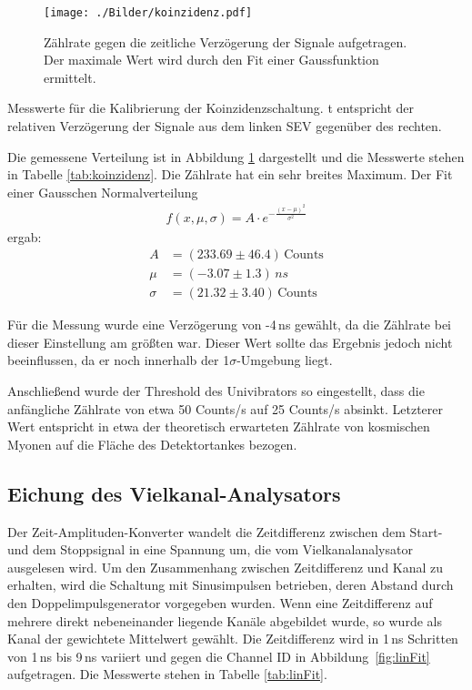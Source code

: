 \begin{figure}[htbp]
	\texttt{[image: ./Bilder/koinzidenz.pdf]}
	\caption{Zählrate gegen die zeitliche Verzögerung der Signale aufgetragen. Der maximale Wert wird durch den Fit einer Gaussfunktion ermittelt.}
	\label{fig:koinzidenz}
\end{figure}

\begin{table}[htbp]
	
	\caption{Messwerte für die Kalibrierung der Koinzidenzschaltung. t entspricht der relativen Verzögerung der Signale aus dem linken SEV gegenüber des rechten.}
	\label{tab:koinzidenz}
\end{table}

Die gemessene Verteilung ist in Abbildung \ref{fig:koinzidenz} dargestellt und die Messwerte stehen in Tabelle \ref{tab:koinzidenz}. Die Zählrate hat ein sehr breites Maximum. Der Fit einer Gausschen Normalverteilung
\begin{align}
	f(x,\mu,\sigma) = A\cdot e^{-\frac{(x-\mu)^2}{\sigma^2}}
\end{align}
ergab:
\begin{align}
A &= (233.69 \pm 46.4)\,\text{Counts}\\
\mu &= (-3.07 \pm 1.3)\,\si{ns}\\
\sigma &= ({21.32} \pm 3.40)\,\si{\text{Counts}}
\end{align}

Für die Messung wurde eine Verzögerung von -4\,\si{ns} gewählt, da die Zählrate bei dieser Einstellung am größten war. Dieser Wert sollte das Ergebnis jedoch nicht beeinflussen, da er noch innerhalb der 1$\sigma$-Umgebung liegt.

Anschließend wurde der Threshold des Univibrators so eingestellt, dass die anfängliche Zählrate von etwa 50 Counts/s auf 25 Counts/s absinkt. Letzterer Wert entspricht in etwa der theoretisch erwarteten Zählrate von kosmischen Myonen auf die Fläche des Detektortankes bezogen.

\subsection{Eichung des Vielkanal-Analysators}
Der Zeit-Amplituden-Konverter wandelt die Zeitdifferenz zwischen dem Start- und dem Stoppsignal in eine Spannung um, die vom Vielkanalanalysator ausgelesen wird. Um den Zusammenhang zwischen Zeitdifferenz und Kanal zu erhalten, wird die Schaltung mit Sinusimpulsen betrieben, deren Abstand durch den Doppelimpulsgenerator vorgegeben wurden. Wenn eine Zeitdifferenz auf mehrere direkt nebeneinander liegende Kanäle abgebildet wurde, so wurde als Kanal der gewichtete Mittelwert gewählt. Die Zeitdifferenz wird in 1\,\si{ns} Schritten von 1\,ns bis 9\,ns variiert und gegen die Channel ID in \mbox{Abbildung \ref{fig:linFit}} aufgetragen. Die Messwerte stehen in Tabelle \ref{tab:linFit}.

